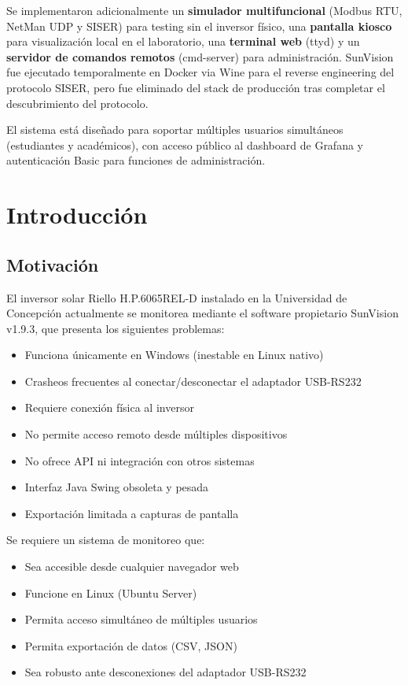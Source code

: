 \documentclass[12pt,a4paper]{article}
\begin{document}
Se implementaron adicionalmente un \textbf{simulador multifuncional} (Modbus RTU, NetMan UDP y SISER) para testing sin el inversor f\'isico, una \textbf{pantalla kiosco} para visualizaci\'on local en el laboratorio, una \textbf{terminal web} (ttyd) y un \textbf{servidor de comandos remotos} (cmd-server) para administraci\'on. SunVision fue ejecutado temporalmente en Docker via Wine para el reverse engineering del protocolo SISER, pero fue eliminado del stack de producci\'on tras completar el descubrimiento del protocolo.

El sistema est\'a dise\~nado para soportar m\'ultiples usuarios simult\'aneos (estudiantes y acad\'emicos), con acceso p\'ublico al dashboard de Grafana y autenticaci\'on Basic para funciones de administraci\'on.

\section{Introducci\'on}

\subsection{Motivaci\'on}

El inversor solar Riello H.P.6065REL-D instalado en la Universidad de Concepci\'on actualmente se monitorea mediante el software propietario SunVision v1.9.3, que presenta los siguientes problemas:

\begin{itemize}
    \item Funciona \'unicamente en Windows (inestable en Linux nativo)
    \item Crasheos frecuentes al conectar/desconectar el adaptador USB-RS232
    \item Requiere conexi\'on f\'isica al inversor
    \item No permite acceso remoto desde m\'ultiples dispositivos
    \item No ofrece API ni integraci\'on con otros sistemas
    \item Interfaz Java Swing obsoleta y pesada
    \item Exportaci\'on limitada a capturas de pantalla
\end{itemize}

Se requiere un sistema de monitoreo que:
\begin{itemize}
    \item Sea accesible desde cualquier navegador web
    \item Funcione en Linux (Ubuntu Server)
    \item Permita acceso simult\'aneo de m\'ultiples usuarios
    \item Permita exportaci\'on de datos (CSV, JSON)
    \item Sea robusto ante desconexiones del adaptador USB-RS232
\end{itemize}
\end{document}
